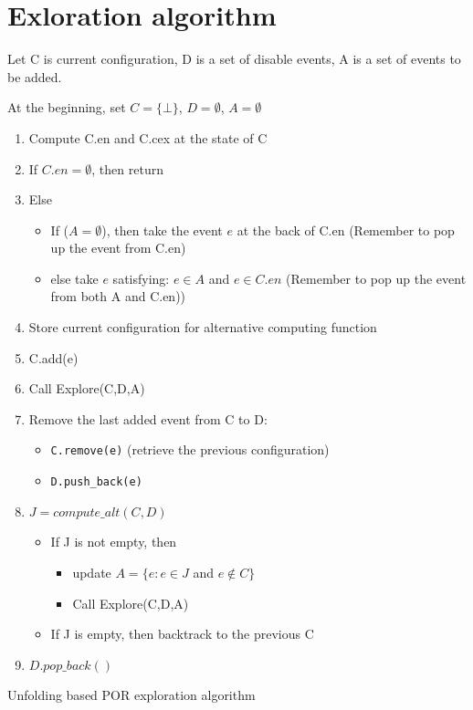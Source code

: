 \documentclass{llncs}
\begin{document}
\section{Exloration algorithm}
\begin{algorithm}
Let C is current configuration, D is a set of disable events, A is a set of events to be added.

At the beginning, set $C = \{\bot \}$, $D = \emptyset$, $A = \emptyset$ 
\begin{enumerate}
	\item
		Compute C.en and C.cex at the state of C
	\item
		If $C.en = \emptyset$, then return
	\item
		Else 
		\begin{itemize}
			\item
				If ($A = \emptyset$), then take the event $e$ at the back of C.en
				(Remember to pop up the event from C.en)
			\item
				else take $e$ satisfying: $e \in A$ and $e \in C.en$
				(Remember to pop up the event from both A and C.en))
		\end{itemize}
	\item
		Store current configuration for alternative computing function
	\item
		C.add(e) 
	\item
		Call Explore(C,D,A)
	\item
		Remove the last added event from C to D: 
		\begin{itemize}
		\item
			\verb!C.remove(e)! (retrieve the previous configuration)
		\item
			\verb!D.push_back(e)!
		\end{itemize}
	\item
		$J = compute\_alt(C,D)$
		\begin{itemize}
			\item
				If J is not empty, then
				\begin{itemize}
					\item
						update $A = \{e: e \in J$ and $e\not\in C\}$
					\item
						Call Explore(C,D,A)
				\end{itemize}
			\item
				If J is empty, then backtrack to the previous C
		\end{itemize}
	\item
		$D.pop\_back()$
\end{enumerate}

\caption{Unfolding based POR exploration algorithm}
\label{a:exp}	
\end{algorithm}
\end{document}
